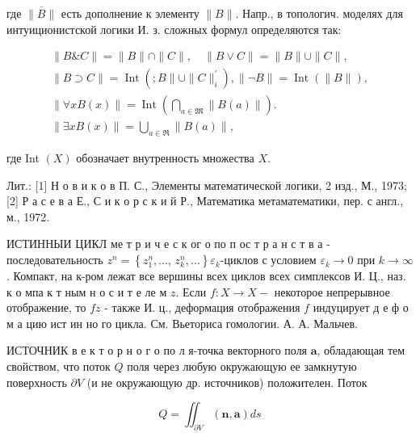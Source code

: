\documentclass[10pt]{article}
\begin{document}
где $\overline{\|B\|}$ есть дополнение к элементу $\|B\|$. Напр., в топологич. моделях для интуиционистской логики И. з. сложных формул определяются так:



\[

\begin{gathered}

\|B \& C\|=\|B\| \cap\|C\|, \quad\|B \vee C\|=\|B\| \cup\|C\|, \\

\|B \supset C\|=\operatorname{Int}\left(; B\|\cup\| C \|_{i}^{\prime}\right),\|\neg B\|=\operatorname{Int}(\|B\|), \\

\|\forall x B(x)\|=\operatorname{Int}\left(\bigcap_{a \in \mathfrak{M}}\|B(a)\|\right) . \\

\|\exists x B(x)\|=\bigcup_{a \in \mathfrak{R}}\|B(a)\|,

\end{gathered}

\]



где Int $(X)$ обозначает внутренность множества $X$.



Лит.: [1] Н о в и к о в П. С., Элементы математической логики, 2 изд., М., 1973; [2] Р а с е в а Е., С и к о р с к и й Р., Математика метаматематики, пер. с англ., м., 1972.



ИСТИННЫИ ЦИКЛ ме т р и ч е с к ог о по п ос т р а н с т в а - последовательность $z^{n}=\left\{z_{1}^{n}, \ldots\right.$, $\left.z_{k}^{n}, \ldots\right\} \varepsilon_{k}$-циклов с условием $\varepsilon_{k} \rightarrow 0$ при $k \rightarrow \infty$. Компакт, на к-ром лежат все вершины всех циклов всех симплексов И. Ц., наз. к о мпа к т ным н о с и т е ле м $z$. Если $f: X \rightarrow X-$ некоторое непрерывное отображение, то $f z$ - также И. ц., деформация отображения $f$ индуцирует д е ф о м а цию ист ин но го цикла. См. Вьеториса гомологии. А. А. Мальчев.



ИСТОЧНИК в е к т о р н о г о по л я-точка векторного поля $\boldsymbol{a}$, обладающая тем свойством, что поток $Q$ поля через любую окружающую ее замкнутую поверхность $\partial V$ (и не окружающую др. источников) положителен. Поток



\[

Q=\iint_{\partial V}(\boldsymbol{n}, \boldsymbol{a}) d s

\]
\end{document}
